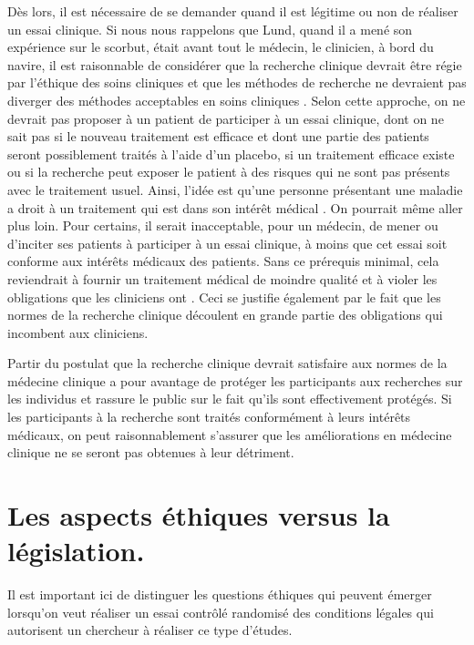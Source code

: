 \documentclass[
  12pt,
]{book}
\begin{document}
Dès lors, il est nécessaire de se demander quand il est légitime ou non de réaliser un essai clinique.
Si nous nous rappelons que Lund, quand il a mené son expérience sur le scorbut, était avant tout le médecin, le clinicien, à bord du navire, il est raisonnable de considérer que la recherche clinique devrait être régie par l'éthique des soins cliniques et que les méthodes de recherche ne devraient pas diverger des méthodes acceptables en soins cliniques \citep{sep-clinical-research}. Selon cette approche, on ne devrait pas proposer à un patient de participer à un essai clinique, dont on ne sait pas si le nouveau traitement est efficace et dont une partie des patients seront possiblement traités à l'aide d'un placebo, si un traitement efficace existe ou si la recherche peut exposer le patient à des risques qui ne sont pas présents avec le traitement usuel. Ainsi, l'idée est qu'une personne présentant une maladie a droit à un traitement qui est dans son intérêt médical \citep{Rothman2000}. On pourrait même aller plus loin. Pour certains, il serait inacceptable, pour un médecin, de mener ou d'inciter ses patients à participer à un essai clinique, à moins que cet essai soit conforme aux intérêts médicaux des patients. Sans ce prérequis minimal, cela reviendrait à fournir un traitement médical de moindre qualité et à violer les obligations que les cliniciens ont \citep{Miller2006}. Ceci se justifie également par le fait que les normes de la recherche clinique découlent en grande partie des obligations qui incombent aux cliniciens.

Partir du postulat que la recherche clinique devrait satisfaire aux normes de la médecine clinique a pour avantage de protéger les participants aux recherches sur les individus et rassure le public sur le fait qu'ils sont effectivement protégés. Si les participants à la recherche sont traités conformément à leurs intérêts médicaux, on peut raisonnablement s'assurer que les améliorations en médecine clinique ne se seront pas obtenues à leur détriment.

\section{Les aspects éthiques versus la législation.}\label{les-aspects-uxe9thiques-versus-la-luxe9gislation.}

Il est important ici de distinguer les questions éthiques qui peuvent émerger lorsqu'on veut réaliser un essai contrôlé randomisé des conditions légales qui autorisent un chercheur à réaliser ce type d'études.
\end{document}

